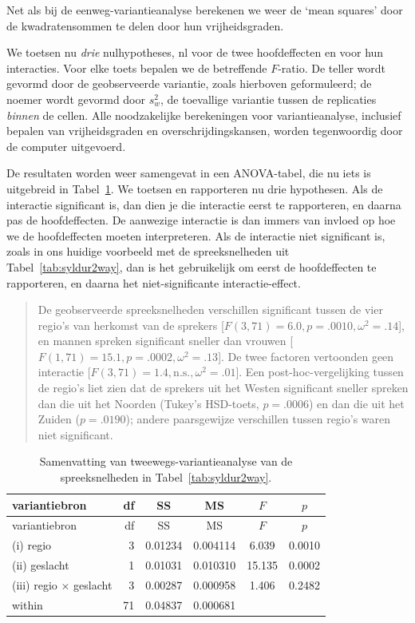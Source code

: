 \documentclass[
]{book}
\begin{document}
Net als bij de eenweg-variantieanalyse berekenen we weer de `mean
squares' door de kwadratensommen te delen door hun vrijheidsgraden.

We toetsen nu \emph{drie} nulhypotheses, nl voor de twee hoofdeffecten en
voor hun interacties. Voor elke toets bepalen we de betreffende
\(F\)-ratio. De teller wordt gevormd door de geobserveerde variantie,
zoals hierboven geformuleerd; de noemer wordt gevormd door \(s^2_w\), de
toevallige variantie tussen de replicaties \emph{binnen} de cellen. Alle
noodzakelijke berekeningen voor variantieanalyse, inclusief bepalen van
vrijheidsgraden en overschrijdingskansen, worden tegenwoordig door de
computer uitgevoerd.

De resultaten worden weer samengevat in een ANOVA-tabel, die nu iets is
uitgebreid in Tabel~\ref{tab:syldur2way-anova}. We toetsen en rapporteren nu drie
hypothesen. Als de interactie significant is, dan dien je die interactie
eerst te rapporteren, en daarna pas de hoofdeffecten. De aanwezige
interactie is dan immers van invloed op hoe we de hoofdeffecten moeten
interpreteren. Als de interactie niet significant is, zoals in ons
huidige voorbeeld met de spreeksnelheden uit
Tabel~\ref{tab:syldur2way}, dan is het gebruikelijk om eerst de
hoofdeffecten te rapporteren, en daarna het niet-significante
interactie-effect.

\begin{quote}
De geobserveerde spreeksnelheden verschillen significant tussen de vier
regio's van herkomst van de sprekers
{[}\(F(3,71)=6.0, p=.0010, \omega^2=.14\){]}, en mannen spreken significant
sneller dan vrouwen {[}\(F(1,71)=15.1, p=.0002, \omega^2=.13\){]}.
De twee
factoren vertoonden geen interactie
{[}\(F(3,71)=1.4, \textrm{n.s.}, \omega^2=.01\){]}.
Een
post-hoc-vergelijking tussen de regio's liet zien dat de sprekers uit
het Westen significant sneller spreken dan die uit het Noorden (Tukey's
HSD-toets, \(p=.0006\)) en dan die uit het Zuiden (\(p=.0190\)); andere
paarsgewijze verschillen tussen regio's waren niet significant.
\end{quote}

\begin{longtable}[]{@{}lrcccc@{}}
\caption{\label{tab:syldur2way-anova} Samenvatting van tweewegs-variantieanalyse van de spreeksnelheden in Tabel~\ref{tab:syldur2way}.}\tabularnewline
\toprule
variantiebron & df & SS & MS & \(F\) & \(p\)\tabularnewline
\midrule
\endfirsthead
\toprule
variantiebron & df & SS & MS & \(F\) & \(p\)\tabularnewline
\midrule
\endhead
(i) regio & 3 & 0.01234 & 0.004114 & 6.039 & 0.0010\tabularnewline
(ii) geslacht & 1 & 0.01031 & 0.010310 & 15.135 & 0.0002\tabularnewline
(iii) regio \(\times\) geslacht & 3 & 0.00287 & 0.000958 & 1.406 & 0.2482\tabularnewline
within & 71 & 0.04837 & 0.000681 & &\tabularnewline
\bottomrule
\end{longtable}
\end{document}
